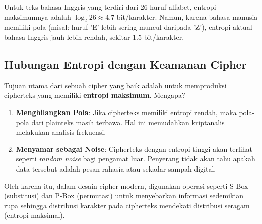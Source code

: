 Untuk teks bahasa Inggris yang terdiri dari 26 huruf alfabet, entropi maksimumnya adalah $\log_2 26 \approx 4.7$ bit/karakter. Namun, karena bahasa manusia memiliki pola (misal: huruf 'E' lebih sering muncul daripada 'Z'), entropi aktual bahasa Inggris jauh lebih rendah, sekitar $1.5$ bit/karakter.

\subsection{Hubungan Entropi dengan Keamanan Cipher}

Tujuan utama dari sebuah cipher yang baik adalah untuk memproduksi cipherteks yang memiliki \textbf{entropi maksimum}. Mengapa?
\begin{enumerate}
    \item \textbf{Menghilangkan Pola}: Jika cipherteks memiliki entropi rendah, maka pola-pola dari plainteks masih terbawa. Hal ini memudahkan kriptanalis melakukan analisis frekuensi.
    \item \textbf{Menyamar sebagai Noise}: Cipherteks dengan entropi tinggi akan terlihat seperti \textit{random noise} bagi pengamat luar. Penyerang tidak akan tahu apakah data tersebut adalah pesan rahasia atau sekadar sampah digital.
\end{enumerate}

Oleh karena itu, dalam desain cipher modern, digunakan operasi seperti S-Box (substitusi) dan P-Box (permutasi) untuk menyebarkan informasi sedemikian rupa sehingga distribusi karakter pada cipherteks mendekati distribusi seragam (entropi maksimal).
